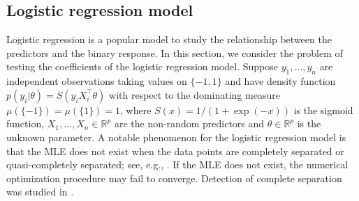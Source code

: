 \documentclass[11pt]{article}
\newcommand{\myT}{\intercal}
\theoremstyle{plain}
\theoremstyle{definition}
\theoremstyle{remark}
\begin{document}

\subsection{Logistic regression model}\label{sec:logistic}
Logistic regression is a popular model to study the relationship between the predictors and the binary response.
In this section, we consider the problem of testing the coefficients of the logistic regression model.
Suppose $y_1, \dots, y_n$ are independent observations taking values on $\{-1,1\}$ and have density function
    $p(y_i | \theta) = S(y_i X_i^\myT \theta)$
    with respect to the dominating measure $\mu(\{-1\}) = \mu(\{1\}) = 1$, where
    $S(x) = 1/(1+\exp(-x))$ is the sigmoid function,
    $X_1, \dots, X_n \in \mathbb R^p$ are the non-random predictors and $\theta \in \mathbb R^p$ is the unknown parameter.
    A notable phenomenon for the logistic regression model is that the MLE does not exist when the data points are completely separated or quasi-completely separated; see, e.g., \cite{Albert1984On,Candes2020The_phase}.
    If the MLE does not exist, the numerical optimization procedure may fail to converge.
    Detection of complete separation was studied in \cite{Lesaffre1989Partial}.
\end{document}
